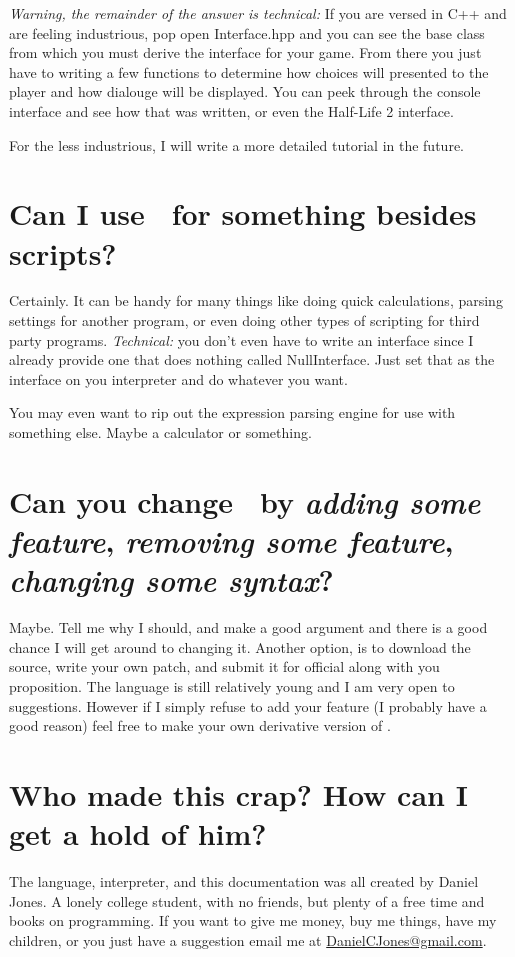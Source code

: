 \documentclass{book}
\begin{document}
\emph{Warning, the remainder of the answer is technical:} If you are versed in C++ and are feeling industrious, pop open Interface.hpp and you can see the base class from which you must derive the interface for your game.   From there you just have to writing a few functions to determine how choices will presented to the player and how dialouge will be displayed.  You can peek through the console interface and see how that was written, or even the Half-Life 2 interface.

For the less industrious, I will write a more detailed tutorial in the future.

\section{Can I use \SSquared\ for something besides scripts?}
Certainly.  It can be handy for many things like doing quick calculations, parsing settings for another program, or even doing other types of scripting for third party programs.  \emph{Technical:} you don't even have to write an interface since I already provide one that does nothing called NullInterface.  Just set that as the interface on you interpreter and do whatever you want.

You may even want to rip out the expression parsing engine for use with something else.  Maybe a calculator or something.

\section{Can you change \SSquared\ by \emph{adding some feature}, \emph{removing some feature}, \emph{changing some syntax}?}
Maybe.  Tell me why I should, and make a good argument and there is a good chance I will get around to changing it.  Another option, is to download the source, write your own patch, and submit it for official along with you proposition.  The language is still relatively young and I am very open to suggestions.  However if I simply refuse to add your feature (I probably have a good reason) feel free to make your own derivative version of \SSquared.

\section{Who made this crap?  How can I get a hold of him?}
The language, interpreter, and this documentation was all created by Daniel Jones.  A lonely college student, with no friends, but plenty of a free time and books on programming.  If you want to give me money, buy me things, have my children, or you just have a suggestion email me at \href{mailto:DanielCJones@gmail.com}{DanielCJones@gmail.com}.
\end{document}
